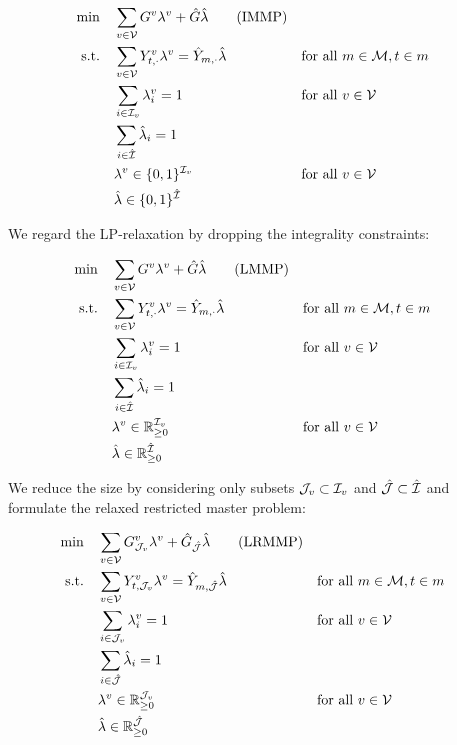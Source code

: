 \begin{align*}
	\min \quad & \sum_{v\in\mathcal{V}}G^v\lambda^v + \hat{G}\hat{\lambda} \tag{IMMP} \\
	\text{s.t.} \quad & \sum_{v\in\mathcal{V}} Y^v_{t,\cdot}\lambda^v = \hat{Y}_{m,\cdot}\hat{\lambda} && \text{for all } m\in\mathcal{M},t\in m \\
	& \sum_{i\in\mathcal{I}_v}\lambda_i^v=1 && \text{for all } v\in\mathcal{V}\\
	& \sum_{i\in\hat{\mathcal{I}}}\hat{\lambda}_i= 1 \\
	& \lambda^v\in\{0,1\}^{\mathcal{I}_v} && \text{for all } v\in\mathcal{V} \\
	& \hat{\lambda}\in\{0,1\}^{\hat{\mathcal{I}}}
\end{align*}

We regard the LP-relaxation by dropping the integrality constraints:

\begin{align*}
	\min \quad & \sum_{v\in\mathcal{V}}G^v\lambda^v + \hat{G}\hat{\lambda} \tag{LMMP} \label{eq:LMMP} \\
	\text{s.t.} \quad & \sum_{v\in\mathcal{V}} Y^v_{t,\cdot}\lambda^v = \hat{Y}_{m,\cdot}\hat{\lambda} && \text{for all } m\in\mathcal{M},t\in m \\
	& \sum_{i\in\mathcal{I}_v}\lambda_i^v=1 && \text{for all } v\in\mathcal{V}\\
	& \sum_{i\in\hat{\mathcal{I}}}\hat{\lambda}_i= 1 \\
	& \lambda^v\in\mathbb{R}_{\geq 0}^{\mathcal{I}_v} && \text{for all } v\in\mathcal{V} \\
	& \hat{\lambda}\in\mathbb{R}_{\geq 0}^{\hat{\mathcal{I}}}
\end{align*}

We reduce the size by considering only subsets $\mathcal{J}_v\subset\mathcal{I}_v$ and $\hat{\mathcal{J}}\subset\hat{\mathcal{I}}$ and formulate the relaxed restricted master problem:

\begin{align*}
	\min \quad & \sum_{v\in\mathcal{V}}G^v_{\mathcal{J}_v}\lambda^v + \hat{G}_{\hat{\mathcal{J}}}\hat{\lambda} \tag{LRMMP} \\
	\text{s.t.} \quad & \sum_{v\in\mathcal{V}} Y^v_{t,\mathcal{J}_v}\lambda^v = \hat{Y}_{m,\hat{\mathcal{J}}}\hat{\lambda} && \text{for all } m\in\mathcal{M},t\in m \\
	& \sum_{i\in\mathcal{J}_v}\lambda_i^v=1 && \text{for all } v\in\mathcal{V}\\
	& \sum_{i\in\hat{\mathcal{J}}}\hat{\lambda}_i= 1 \\
	& \lambda^v\in\mathbb{R}_{\geq 0}^{\mathcal{J}_v} && \text{for all } v\in\mathcal{V} \\
	& \hat{\lambda}\in\mathbb{R}_{\geq 0}^{\hat{\mathcal{J}}}
\end{align*}

